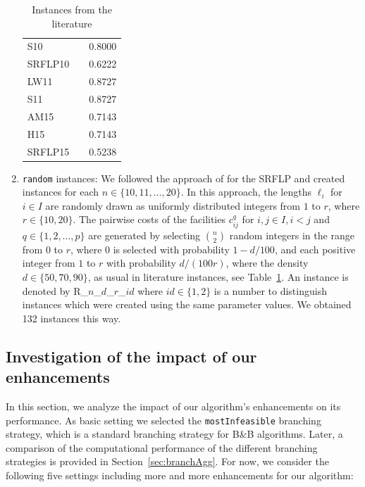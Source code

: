 \documentclass{article}
\newcommand{\BB}{B\&B\xspace}
\newcommand{\SRFLP}{SRFLP\xspace}
\begin{document}
\begin{enumerate}[label=(\roman*)]
\begin{table}[htb]
\begin{tabular}{llr}
        S10 & \citet{SIMMONS1969} & 0.8000\\
        SRFLP10 & \citet{Hungerlander2012Tech} & 0.6222\\
        LW11 & \citet{LOVE1976}& 0.8727\\
        S11 & \citet{SIMMONS1969} & 0.8727\\
        AM15 & \citet{AMARAL2006} & 0.7143\\
        H15 & \citet{HERAGU1991} & 0.7143\\
        SRFLP15 & \citet{Hungerlander2012Tech} & 0.5238\\      
        \bottomrule
    \end{tabular}
    \caption{Instances from the literature}
    \label{tab:litInstances}
\end{table}
\item \texttt{random} instances: We followed the approach of \citet{PALUBECKIS2017} for the \SRFLP and created instances for each $n \in \{10, 11, \dots, 20\}$. In this approach, the lengths $\ell_i$ for $i \in I$ are randomly drawn as uniformly distributed integers from $1$ to $r$, where $r \in \{10,20\}$. The pairwise costs of the facilities $c_{ij}^q$ for $i,j \in I, i < j$ and $q \in \{1,2,\dots,p\}$ are generated by selecting $\binom{n}{2}$ random integers in the range from $0$ to $r$, where $0$ is selected with probability $1-d/100$, and each positive integer from $1$ to $r$ with probability $d/(100r)$, where the density $d\in\{50,70,90\}$, as usual in literature instances, see Table~\ref{tab:litInstances}. An instance is denoted by R\_$n$\_$d$\_$r$\_$id$ where $id \in \{1, 2\}$ is a number to distinguish instances which were created using the same parameter values. We obtained 132 instances this way.
\end{enumerate}

\subsection{Investigation of the impact of our enhancements}\label{sec:ingredients}
In this section, we analyze the impact of our algorithm's enhancements on its performance. 
As basic setting we selected the \texttt{mostInfeasible} branching strategy, which is a standard branching strategy for \BB algorithms. Later, a comparison of the computational performance of the different branching strategies is provided in Section~\ref{sec:branchAgg}. For now, we consider the following five settings including more and more enhancements for our algorithm:
\end{document}

